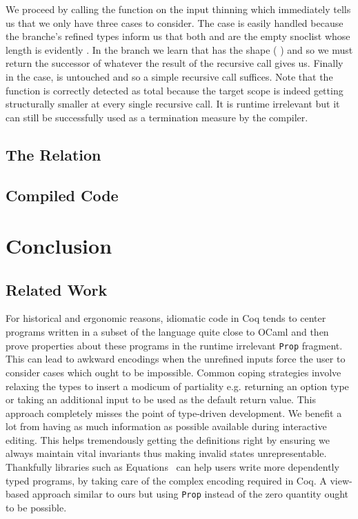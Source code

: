 \documentclass{article}
\newcommand{\coq}{Coq}
\begin{document}

We proceed by calling the  function on the input thinning
which immediately tells us that we only have three cases to consider.
%
The  case is easily handled because the branche's refined
types inform us that both  and  are the
empty snoclist \IdrisData{[<]} whose length is evidently .
%
In the  branch we learn that  has the shape
(\IdrisBound{\_} \IdrisData{:<} ) and so we must return the
successor of whatever the result of the recursive call gives us.
%
Finally in the  case,  is untouched and so a
simple recursive call suffices.
%
Note that the function is correctly detected as total because the target scope
 is indeed getting structurally smaller at every single recursive
call.
%
It is runtime irrelevant but it can still be successfully used as a termination
measure by the compiler.

\subsection{The  Relation}

\subsection{Compiled Code}

\section{Conclusion}

\subsection{Related Work}

For historical and ergonomic reasons, idiomatic code in \coq{} tends to center programs
written in a subset of the language quite close to OCaml and then prove properties
about these programs in the runtime irrelevant \texttt{Prop} fragment.
%
This can lead to awkward encodings when the unrefined inputs force the user to consider
cases which ought to be impossible. Common coping strategies involve relaxing the types
to insert a modicum of partiality e.g. returning an option type or taking an additional
input to be used as the default return value.
%
This approach completely misses the point of type-driven development. We benefit a lot
from having as much information as possible available during interactive editing. This
helps tremendously getting the definitions right by ensuring we always maintain vital
invariants thus making invalid states unrepresentable.
%
Thankfully libraries such as Equations~\cite{DBLP:conf/itp/Sozeau10,DBLP:journals/pacmpl/SozeauM19}
can help users write more dependently typed programs, by taking care of the complex
encoding required in \coq{}. A view-based approach similar to ours but using \texttt{Prop}
instead of the zero quantity ought to be possible.
\end{document}
